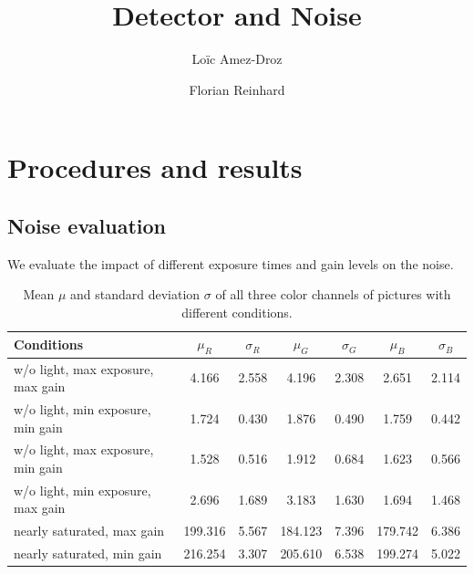 \documentclass[a4paper, 12pt]{paper}
\author{Loïc Amez-Droz \and Florian Reinhard}
\title{Detector and Noise}
\begin{document}

\section{Procedures and results}
\subsection{Noise evaluation}

We evaluate the impact of different exposure times and gain levels on the noise.


\begin{table}[H]
    \centering
    \begin{tabular}{l S[table-format=3.3] S[table-format=1.3] S[table-format=3.3] S[table-format=1.3] S[table-format=3.3] S[table-format=1.3]}
        \toprule
        Conditions & {$\mu_R$} & {$\sigma_R$} & {$\mu_G$} & {$\sigma_G$} & {$\mu_B$} & {$\sigma_B$} \\
        \midrule
        w/o light, max exposure, max gain & 4.166 & 2.558 & 4.196 & 2.308 & 2.651 & 2.114\\
        w/o light, min exposure, min gain & 1.724 & 0.430 & 1.876 & 0.490 & 1.759 & 0.442 \\
        w/o light, max exposure, min gain & 1.528 & 0.516 & 1.912 & 0.684 & 1.623 & 0.566 \\
        w/o light, min exposure, max gain & 2.696 & 1.689 & 3.183 & 1.630 & 1.694 & 1.468 \\
        nearly saturated, max gain & 199.316 & 5.567 & 184.123 & 7.396 & 179.742 & 6.386 \\
        nearly saturated, min gain & 216.254 & 3.307 & 205.610 & 6.538 & 199.274 & 5.022 \\
        \bottomrule
    \end{tabular}
    \caption{Mean $\mu$ and standard deviation $\sigma$ of all three color channels of pictures with different conditions.}
\label{tab:means_stds}
\end{table}

\end{document}
